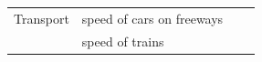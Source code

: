 {{\begin{center}
\begin{xtabular}[t]{|l|l|l|l|}
        Transport &
    
    
        speed of cars on freeways &
    
    
         &
    
    
     \tabularnewline{}
    
    
         &
    
    
        speed of trains &
    
    
         &
    
    
     \tabularnewline{}
    
    

\end{xtabular}
\end{center}}}
